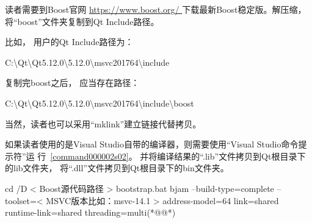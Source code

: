 读者需要到Boost官网 \url{https://www.boost.org/
}下载最新Boost稳定版。解压缩，将“boost”文件夹复制到Qt Include路径。

比如，
用户的Qt Include路径为：
\begin{littlelongworld}
C:\textbackslash{}Qt\textbackslash{}Qt5.12.0\textbackslash{}5.12.0\textbackslash{}msvc2017\underline{\hspace{0.5em}}64\textbackslash{}include
\end{littlelongworld}
\hspace*{\parindent}复制完boost之后，
应当存在路径：
\begin{littlelongworld}
C:\textbackslash{}Qt\textbackslash{}Qt5.12.0\textbackslash{}5.12.0\textbackslash{}msvc2017\underline{\hspace{0.5em}}64\textbackslash{}include\textbackslash{}boost
\end{littlelongworld}
\hspace*{\parindent}当然，读者也可以采用“mklink”建立链接代替拷贝。

如果读者使用的是Visual Studio自带的编译器，则需要使用“Visual Studio命令提示符”运
行\commandnumbernameone\ \ref{command000002s02}。
并将编译结果的“\raisebox{-0.35ex}{\sourcefonttwo{}*}.lib”文件拷贝到Qt根目录下的lib文件夹，
将“\raisebox{-0.35ex}{\sourcefonttwo{}*}.dll”文件拷贝到Qt根目录下的bin文件夹。

\renewcommand\thelstnumber{\ifnum\value{lstnumber}>3{\ }\else{\arabic{lstnumber}}\fi}
{}\label{command000002s02}    %
\begin{thebookfilesourceonecommand}[escapeinside={(*@}{@*)},
caption=GoodLuck,
title=\commandnumbernameone \thecommandnumber
]
cd /D < Boost源代码路径 >
bootstrap.bat
bjam --build-type=complete
     --toolset=< MSVC版本比如：msvc-14.1 >
     address-model=64
     link=shared
     runtime-link=shared
     threading=multi(*@\marginpar[\hfill\setlength\fboxsep{2pt}\fbox{\footnotesize{\kaishu\parbox{1em}{\setlength{\baselineskip}{2pt}\commandnumbernameone}}\footnotesize{\thecommandnumber}}]{\setlength\fboxsep{2pt}\fbox{\footnotesize{\kaishu\parbox{1em}{\setlength{\baselineskip}{2pt}\commandnumbernameone}}\footnotesize{\thecommandnumber}}}@*)\end{thebookfilesourceonecommand}          %
\addtocounter{lstlisting}{-1}   %

\renewcommand\thelstnumber{\arabic{lstnumber}}

